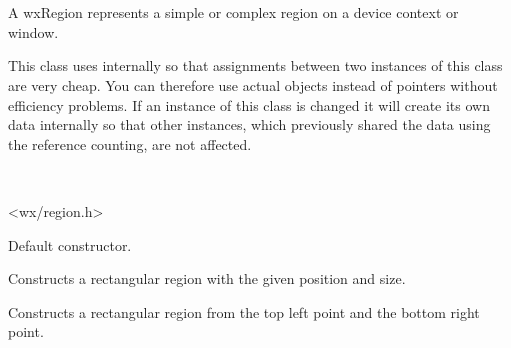 
\section{}\label{wxregion}

A wxRegion represents a simple or complex region on a device context or window.

This class uses 
internally so that assignments between two instances of this class are very
cheap. You can therefore use actual objects instead of pointers without
efficiency problems. If an instance of this class is changed it will create
its own data internally so that other instances, which previously shared the
data using the reference counting, are not affected.


\\


<wx/region.h>





\label{wxregionctor}


Default constructor.


Constructs a rectangular region with the given position and size.


Constructs a rectangular region from the top left point and the bottom right point.



